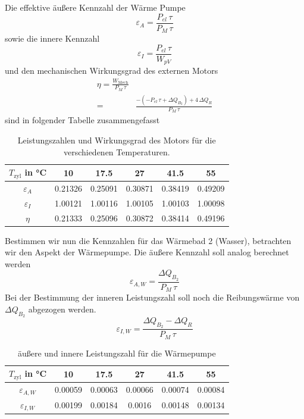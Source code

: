 \documentclass[a4paper, 12pt,]{scrartcl}
\begin{document}
Die effektive äußere Kennzahl der Wärme Pumpe
\begin{equation*}\varepsilon_{A}=\frac{P_{el}\,\tau}{P_M\,\tau}\end{equation*}
sowie die innere Kennzahl
\begin{equation*}\varepsilon_{I}=\frac{P_{el}\,\tau}{W_{pV}}\end{equation*}
und den mechanischen Wirkungsgrad des externen Motors
\begin{align*}\eta=\frac{W_\text{Mech}}{P_M\,\tau}\\
=&\frac{-(-P_{el}\,\tau+\Delta{Q_{B_2}})+4\,\Delta{Q_R}}{P_M\,\tau}\end{align*}
sind in folgender Tabelle zusammengefasst
\begin{table}[H]\centering\begin{tabular}{c|ccccc}
$T_\text{zyl}$ in °C&10&17.5&27&41.5&55\\\hline
$\varepsilon_A$&0.21326	&0.25091	&0.30871	&0.38419	&0.49209\\
$\varepsilon_I$&1.00121	&1.00116	&1.00105	&1.00103	&1.00098\\
$\eta$&0.21333	&0.25096	&0.30872	&0.38414	&0.49196\end{tabular}
\caption{Leistungszahlen und Wirkungsgrad des Motors für die verschiedenen Temperaturen.}\end{table}

Bestimmen wir nun die Kennzahlen für das Wärmebad 2 (Wasser), betrachten wir den Aspekt der Wärmepumpe. Die äußere Kennzahl soll analog berechnet werden
\begin{equation*}\varepsilon_{A,W}=\frac{\Delta{Q_{B_2}}}{P_M\,\tau}\end{equation*}
Bei der Bestimmung der inneren Leistungszahl soll noch die Reibungswärme von$\Delta{Q_{B_2}}$ abgezogen werden.
\begin{equation*}\varepsilon_{I,W}=\frac{\Delta{Q_{B_2}}-\Delta{Q_R}}{P_M\,\tau}\end{equation*}
\begin{table}[H]\centering\begin{tabular}{c|ccccc}
$T_\text{zyl}$ in °C&10&17.5&27&41.5&55\\\hline
$\varepsilon_{A,W}$&0.00059	&0.00063	&0.00066	&0.00074	&0.00084\\
$\varepsilon_{I,W}$&0.00199	&0.00184	&0.0016	&0.00148	&0.00134\end{tabular}
\caption{äußere und innere Leistungszahl für die Wärmepumpe}\end{table}
\end{document}
